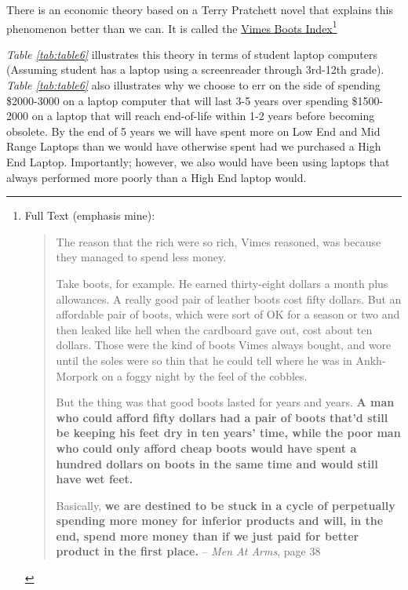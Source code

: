 There is an economic theory based on a Terry Pratchett novel that explains this phenomenon better than we can. It is called the \href{http://en.wikipedia.org/wiki/Boots_theory}{Vimes Boots Index}\footnote{\raggedright Full Text (emphasis mine):
\begin{leftbar}
\begin{quote}The reason that the rich were so rich, Vimes reasoned, was because they managed to spend less money.

Take boots, for example. He earned thirty-eight dollars a month plus allowances. A really good pair of leather boots cost fifty dollars. But an affordable pair of boots, which were sort of OK for a season or two and then leaked like hell when the cardboard gave out, cost about ten dollars. Those were the kind of boots Vimes always bought, and wore until the soles were so thin that he could tell where he was in Ankh-Morpork on a foggy night by the feel of the cobbles.

But the thing was that good boots lasted for years and years. \textbf{A man who could afford fifty dollars had a pair of boots that’d still be keeping his feet dry in ten years’ time, while the poor man who could only afford cheap boots would have spent a hundred dollars on boots in the same time and would still have wet feet.}

Basically, \textbf{we are destined to be stuck in a cycle of perpetually spending more money for inferior products and will, in the end, spend more money than if we just paid for better product in the first place.} \break \qquad-- \textit{Men At Arms}, page 38
\end{quote}
\end{leftbar}
}

\hfill \break \textit{Table \ref{tab:table6}} illustrates this theory in terms of student laptop computers (Assuming student has a laptop using a screenreader through 3rd-12th grade). \textit{Table \ref{tab:table6}} also illustrates why we choose to err on the side of spending \$2000-3000 on a laptop computer that will last 3-5 years over spending \$1500-2000 on a laptop that will reach end-of-life within 1-2 years before becoming obsolete. By the end of 5 years we will have spent more on Low End and Mid Range Laptops than we would have otherwise spent had we purchased a High End Laptop. Importantly; however, we also would have been using laptops that always performed more poorly than a High End laptop would.

